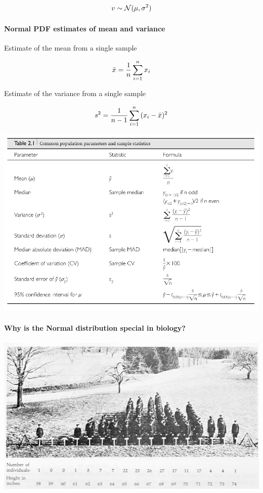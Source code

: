 \documentclass[
]{book}
\begin{document}
\[\large v \sim \mathcal{N} (\mu,\sigma^2)\]

\hypertarget{normal-pdf-estimates-of-mean-and-variance}{%
\paragraph{Normal PDF \textbar{} estimates of mean and variance}\label{normal-pdf-estimates-of-mean-and-variance}}

Estimate of the mean from a single sample

\[\Large \bar{x} = \frac{1}{n}\sum_{i=1}^{n}{x_i} \]

Estimate of the variance from a single sample

\[\Large s^2 = \frac{1}{n-1}\sum_{i=1}^{n}{(x_i - \bar{x})^2} \]

\begin{center}\includegraphics[width=0.9\linewidth]{images/week_2.010} \end{center}

\hypertarget{why-is-the-normal-distribution-special-in-biology}{%
\paragraph{Why is the Normal distribution special in biology?}\label{why-is-the-normal-distribution-special-in-biology}}

\begin{center}\includegraphics[width=1\linewidth]{images/week_2.013} \end{center}
\end{document}
